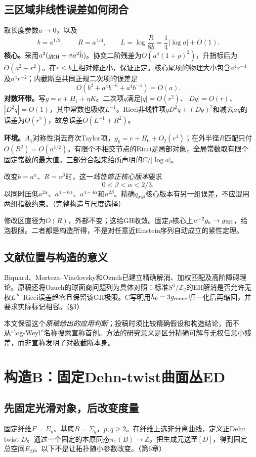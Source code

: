 \documentclass[UTF8,fontset=fandol,zihao=-4]{ctexart}
\theoremstyle{research}
\newcommand{\Z}{\mathbb Z}
\numberwithin{equation}{section}
\begin{document}
\subsection{三区域非线性误差如何闭合}
取长度参数$a\to0$，以及
\[
b=a^{1/2},\qquad R=a^{1/4},\qquad
L=\log\frac{R}{8b}=\frac14|\log a|+O(1).
\]
\textbf{核心。}采用$a^2(g_{\rm EH}+\sigma a^2\widetilde h)$。协变二阶残差为$O(a^4(1+\rho)^2)$，升指标后为$O(a^2+r^2)$。在$r\le b$上相对修正小，保证正定。核心尾项的物理大小包含$a^4r^{-4}$及$a^4r^{-2}$；内截断至共同正规二次项的误差是
\[
O(b^2+a^4b^{-6}+a^4b^{-4})=O(a).
\]
\textbf{对数环带。}写$g=e+H_1+\eta K$。二次项$q$满足$|q|=O(r^2)$、$|Dq|=O(r)$、$|D^2q|=O(1)$，其中常数也吸收$L^{-1}$。Ricci非线性项$qD^2q+(Dq)^2$和减去$\sigma q$的误差为$O(r^2)$，故总误差$O(L^{-1}+R^2)$。

\textbf{环境。}$A_1$对称性消去奇次Taylor项，$g_0=e+H_0+O_2(r^4)$；在外半径$R$匹配只付$O(R^2)=O(a^{1/2})$。有限个不相交节点的Ricci是局部对象，全局常数取有限个固定常数的最大值。三部分合起来给所声明的$C/|\log a|$。

改变$b=a^\alpha$、$R=a^\beta$时，这一\emph{线性修正核心版本}要求
\[
0<\beta<\alpha<2/3,
\]
以同时压低$a^{2\alpha}$、$a^{4-6\alpha}$、$a^{4-4\alpha}$和$a^{2\beta}$。精确$q_{\sigma a^2}$核心版本有另一组误差，不应混用两组指数约束。\cite{C}（完整构造与尺度选择）

修改区直径为$O(R)$，外部不变；这给GH收敛。固定$\rho$核心上$a^{-2}g_a\to g_{\rm EH}$，给泡极限。二者都是构造所得，不是对任意近Einstein序列自动成立的紧性定理。

\subsection{文献位置与构造的意义}
Biquard、Morteza--Viaclovsky和Ozuch已建立精确解消、加权匹配及高阶障碍理论。原稿还将Ozuch的球面商问题列为具体对照：标准$S^4/\Z_2$的EH解消是否允许无权$L^\infty$ Ricci误差趋零且保留该GH极限。C写明用$h_0=3g_{\rm round}$归一化后再缩回，并要求实际标记相容。\cite{C}（§3）\cite{OzuchII}

本文保留这个\emph{原稿给出的应用判断}；投稿时须比较精确假设和构造结论，而不从“log-Weyl”名称搜索宣称首创。方法的研究意义是区分精确可解与无权任意小残差，而非宣称发明了对数截断本身。

\section{构造B：固定Dehn-twist曲面丛ED}
\subsection{先固定光滑对象，后改变度量}
固定纤维$F=\Sigma_p$、基底$B=\Sigma_q$，$p,q\ge2$。在纤维上选非分离曲线，定义正Dehn twist $D$。通过一个固定的本原同态$\pi_1(B)\to\Z$，把生成元送至$[D]$，得到固定总空间$E_D$。以下不是让拓扑随小参数改变。\cite{L}（第6章）
\end{document}
